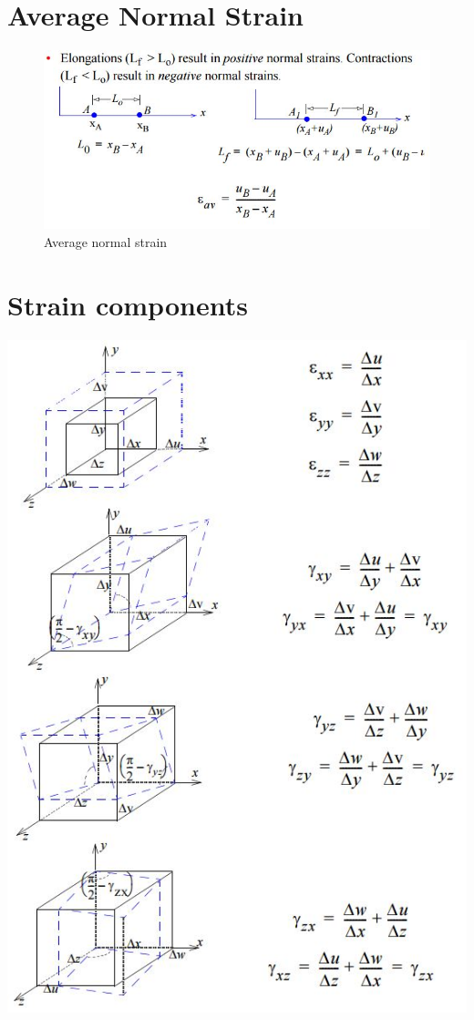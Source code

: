\section{Average Normal Strain}
\begin{figure}[h]
\centering
\includegraphics[width=0.7\linewidth]{figure/average_normal_strain}
\caption{Average normal strain}
\label{fig:strain_def}
\end{figure}

\section{Strain components}
\includegraphics[width=0.7\linewidth]{figure/strain_components}
\label{fig:strain_components}

